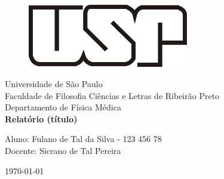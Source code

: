 \documentclass[a4paper, 12pt]{article}
\begin{document}

\begin{titlepage}
	\begin{center}
	
	\begin{figure}[!ht]
	\centering
	\includegraphics[width=7cm]{usp-logo-2.jpg}
	\end{figure}

		\Huge{Universidade de São Paulo}\\
		\large{Faculdade de Filosofia Ciências e Letras de Ribeirão Preto}\\ 
		\large{Departamento de Física Médica}\\ 
		\vspace{35pt}
        \vspace{95pt}
        \textbf{\LARGE{Relatório (título) }}\\
		\vspace{5,5cm}
	\end{center}
	
	\begin{flushleft}
		\begin{tabbing}
			Aluno: Fulano de Tal da Silva - 123 456 78 \\
			Docente: Sicrano de Tal Pereira
	\end{tabbing}
 \end{flushleft}
	\vspace{1cm}
	
	\begin{center}
		\vspace{\fill}
			 \today\\
			\end{center}
\end{titlepage}

\end{document}
